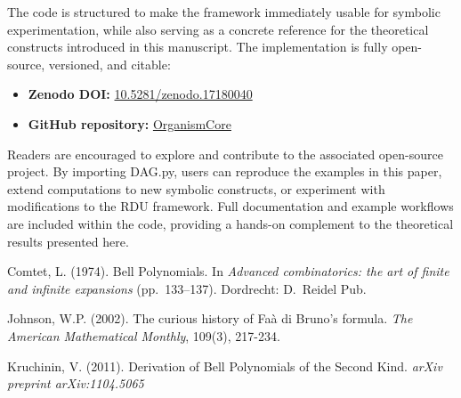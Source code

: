\documentclass[11pt]{article}
\theoremstyle{plain}
\theoremstyle{definition}
\begin{document}
The code is structured to make the framework immediately usable for symbolic experimentation, while also serving as a concrete reference for the theoretical constructs introduced in this manuscript. The implementation is fully open-source, versioned, and citable:

\begin{itemize}
    \item \textbf{Zenodo DOI:} \href{https://doi.org/10.5281/zenodo.17180040}{10.5281/zenodo.17180040}
    \item \textbf{GitHub repository:} \href{https://github.com/Eric-Robert-Lawson/OrganismCore/tree/main}{OrganismCore}
\end{itemize}

Readers are encouraged to explore and contribute to the associated open-source project. By importing DAG.py, users can reproduce the examples in this paper, extend computations to new symbolic constructs, or experiment with modifications to the RDU framework. Full documentation and example workflows are included within the code, providing a hands-on complement to the theoretical results presented here.


\begin{thebibliography}{99}
Comtet, L. (1974).
\newblock Bell Polynomials.
\newblock In \textit{Advanced combinatorics: the art of finite and infinite expansions} (pp.\ 133--137).
\newblock Dordrecht: D.\ Reidel Pub.

Johnson, W.P. (2002).
\newblock The curious history of Faà di Bruno’s formula.
\newblock \textit{The American Mathematical Monthly}, 109(3), 217-234.

Kruchinin, V. (2011).
\newblock Derivation of Bell Polynomials of the Second Kind.
\newblock \textit{arXiv preprint arXiv:1104.5065}
\end{thebibliography}
\end{document}
